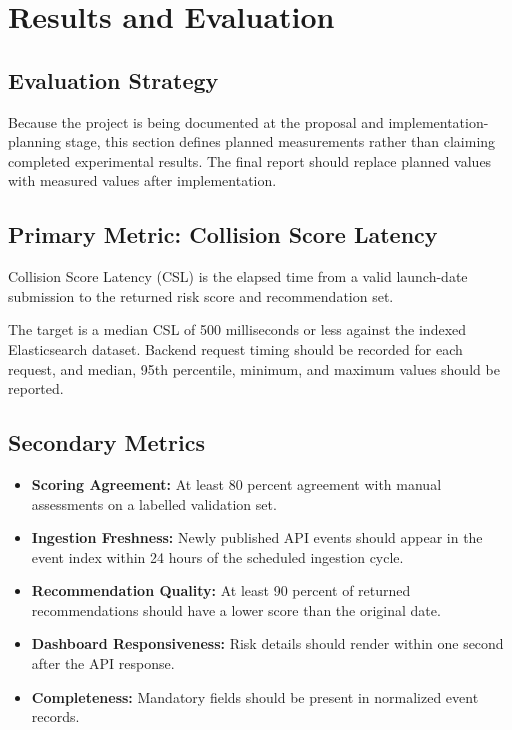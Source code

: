 \documentclass[12pt]{article}
\begin{document}
\section{Results and Evaluation}

\subsection{Evaluation Strategy}
Because the project is being documented at the proposal and implementation-planning stage, this section defines planned measurements rather than claiming completed experimental results. The final report should replace planned values with measured values after implementation.

\subsection{Primary Metric: Collision Score Latency}
Collision Score Latency (CSL) is the elapsed time from a valid launch-date submission to the returned risk score and recommendation set.

The target is a median CSL of 500 milliseconds or less against the indexed Elasticsearch dataset. Backend request timing should be recorded for each request, and median, 95th percentile, minimum, and maximum values should be reported.

\subsection{Secondary Metrics}
\begin{itemize}[leftmargin=0.7cm]
\item \textbf{Scoring Agreement:} At least 80 percent agreement with manual assessments on a labelled validation set.
\item \textbf{Ingestion Freshness:} Newly published API events should appear in the event index within 24 hours of the scheduled ingestion cycle.
\item \textbf{Recommendation Quality:} At least 90 percent of returned recommendations should have a lower score than the original date.
\item \textbf{Dashboard Responsiveness:} Risk details should render within one second after the API response.
\item \textbf{Completeness:} Mandatory fields should be present in normalized event records.
\end{itemize}
\end{document}
